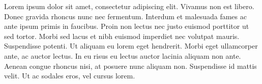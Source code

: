 

\begin{cvparagraph}

Lorem ipsum dolor sit amet, consectetur adipiscing elit. Vivamus non est libero. Donec gravida rhoncus nunc nec fermentum. Interdum et malesuada fames ac ante ipsum primis in faucibus. Proin non lectus nec justo euismod porttitor ut sed tortor. Morbi sed lacus et nibh euismod imperdiet nec volutpat mauris. Suspendisse potenti. Ut aliquam eu lorem eget hendrerit. Morbi eget ullamcorper ante, ac auctor lectus. In eu risus eu lectus auctor lacinia aliquam non ante. Aenean congue rhoncus nisi, at posuere nunc aliquam non. Suspendisse id mattis velit. Ut ac sodales eros, vel cursus lorem. 
\end{cvparagraph}

